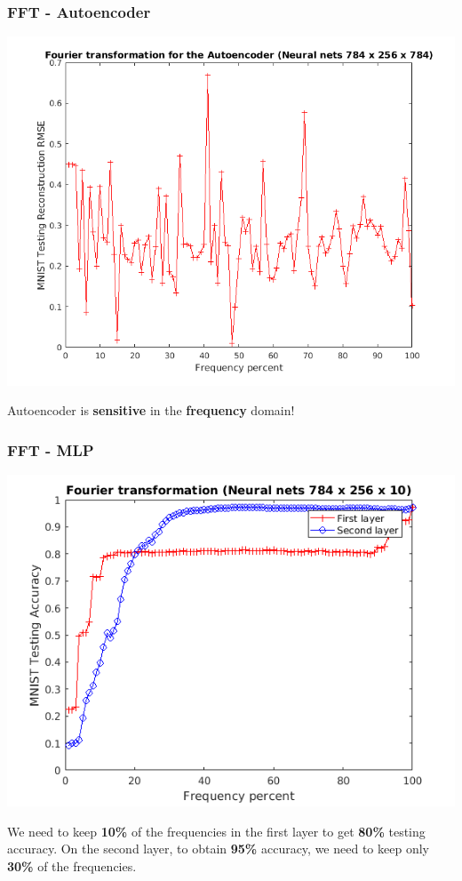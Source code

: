 \documentclass[7pt]{beamer}
\begin{document}
\begin{sloppypar}
\begin{frame}
\frametitle{FFT - Autoencoder}
\begin{justify}
\begin{center}
	\includegraphics[scale=0.45]{Fourier-Autoencoder}
\end{center}
Autoencoder is \textbf{sensitive} in the \textbf{frequency} domain!
\end{justify}
\end{frame}


\begin{frame}
\frametitle{FFT - MLP}
\begin{justify}
\begin{center}
	\includegraphics[scale=0.45]{Fourier-Neural-Nets}
\end{center}
\end{justify}
We need to keep \textbf{10\%} of the frequencies in the first layer to get \textbf{80\%} testing accuracy. On the second layer, to obtain \textbf{95\%} accuracy, we need to keep only \textbf{30\%} of the frequencies.
\end{frame}



\end{sloppypar}
\end{document}
